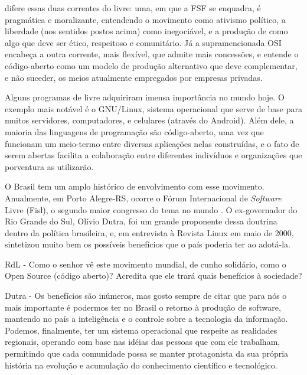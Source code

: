 \textcite{evangelista_movimento_2014} difere essas duas correntes do \swr{} livre: uma, em que a FSF se enquadra, é pragmática e moralizante, entendendo o movimento como ativismo político, a liberdade (nos sentidos postos acima) como inegociável, e a produção de \swr{} como algo que deve ser ético, respeitoso e comunitário.
Já a supramencionada OSI encabeça a outra corrente, mais flexível, que admite mais concessões, e entende o código-aberto como um modelo de produção alternativo que deve complementar, e não suceder, os meios atualmente empregados por empresas privadas.

Alguns programas de \swr{} livre adquiriram imensa importância no mundo hoje.
O exemplo mais notável é o GNU/Linux, sistema operacional que serve de base para muitos servidores, computadores, e celulares (através do Android).
Além dele, a maioria das linguagens de programação são código-aberto, uma vez que funcionam um meio-termo entre diversas aplicações nelas construídas, e o fato de serem abertas facilita a colaboração entre diferentes indivíduos e organizações que porventura as utilizarão.

O Brasil tem um amplo histórico de envolvimento com esse movimento.
Anualmente, em Porto Alegre-RS, ocorre o Fórum Internacional de \textit{Software} Livre (Fisl), o segundo maior congresso do tema no mundo \cite{evangelista_movimento_2014}.
O ex-governador do Rio Grande do Sul, Olívio Dutra, foi um grande proponente dessa doutrina dentro da política brasileira, e, em entrevista à Revista Linux em maio de 2000, sintetizou muito bem os possíveis benefícios que o país poderia ter ao adotá-la.

\begin{citacao}
RdL - Como o senhor vê este movimento mundial, de cunho solidário, como o Open Source (código aberto)? Acredita que ele trará quais benefícios à sociedade?

Dutra - Os benefícios são inúmeros, mas gosto sempre de citar que para nós o mais importante é podermos ter no Brasil o retorno à produção de software, mantendo no país a inteligência e o controle sobre a tecnologia da informação. Podemos, finalmente, ter um sistema operacional que respeite as realidades regionais, operando com base nas idéias das pessoas que com ele trabalham, permitindo que cada comunidade possa se manter protagonista da sua própria história na evolução e acumulação do conhecimento científico e tecnológico.
\cite{dutra_governador_2000}
\end{citacao}


